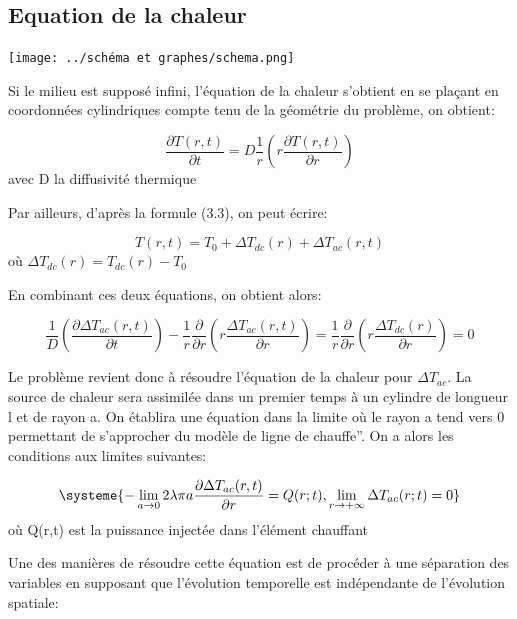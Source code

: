 \documentclass[10pt,a4paper]{report}
\begin{document}
\subsection{Equation de la chaleur}
\begin{center}
\texttt{[image: ../schéma et graphes/schema.png]}  
\label{fig2}
\end{center}
Si le milieu est supposé infini, l’équation de la chaleur s’obtient en se plaçant en coordonnées cylindriques compte tenu de la géométrie du problème, on obtient:
\begin{center}
\begin{equation}
\frac{\partial T(r,t)}{\partial t}=D\frac{1}{r}(r\frac{\partial T(r,t)}{\partial r})
\end{equation}
avec D la diffusivité thermique 
\end{center}
Par ailleurs, d'après la formule (3.3), on peut écrire:
\begin{center}
\begin{equation}
T(r,t)=T_{0}+\Delta T_{dc}(r)+\Delta T_{ac}(r,t)
\end{equation}
où $\Delta T_{dc}(r)=T_{dc}(r)-T_{0}$
\end{center}
En combinant ces deux équations, on obtient alors:
\begin{center}
\begin{equation}
\frac{1}{D}(\frac{\partial \Delta T_{ac}(r,t)}{\partial t})-\frac{1}{r}\frac{\partial}{\partial r}(r\frac{\Delta T_{ac}(r,t)}{\partial r})=\frac{1}{r}\frac{\partial}{\partial r}(r\frac{\Delta T_{dc}(r)}{\partial r})=0
\end{equation}
\end{center}
Le problème revient donc à résoudre l’équation de la chaleur pour $\Delta T_{ac}$. La source de chaleur sera assimilée dans un premier temps à un cylindre de longueur l et de rayon a. On établira une équation dans la limite où le rayon a tend vers 0 permettant de s’approcher du modèle de ligne de chauffe”. On a alors les conditions aux limites suivantes:
\begin{center}
\begin{equation}
\systeme{-\lim\limits_{a \rightarrow 0}2\lambda\pi a\frac{\partial \Delta T_{ac}(r,t)}{\partial r}=Q(r;t),\lim\limits_{r \rightarrow +\infty}\Delta T_{ac}(r;t)=0}
\end{equation}
où Q(r,t) est la puissance injectée dans l'élément chauffant
\end{center}
Une des manières de résoudre cette équation est de procéder à une séparation des variables en supposant que l'évolution temporelle est indépendante de l’évolution spatiale:
\end{document}
